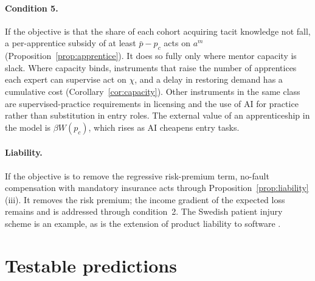 \documentclass[12pt]{article}
\theoremstyle{remark}
\begin{document}
\paragraph{Condition 5.} If the objective is that the share of each cohort acquiring tacit knowledge not fall, a per-apprentice subsidy of at least $\bar p-p_c$ acts on $a^m$ (Proposition~\ref{prop:apprentice}). It does so fully only where mentor capacity is slack. Where capacity binds, instruments that raise the number of apprentices each expert can supervise act on $\chi$, and a delay in restoring demand has a cumulative cost (Corollary~\ref{cor:capacity}). Other instruments in the same class are supervised-practice requirements in licensing and the use of AI for practice rather than substitution in entry roles. The external value of an apprenticeship in the model is $\beta W(p_c)$, which rises as AI cheapens entry tasks.

\paragraph{Liability.} If the objective is to remove the regressive risk-premium term, no-fault compensation with mandatory insurance acts through Proposition~\ref{prop:liability}(iii). It removes the risk premium; the income gradient of the expected loss remains and is addressed through condition~2. The Swedish patient injury scheme \citep{sweden1996patient} is an example, as is the extension of product liability to software \citep{eu2024pld}.

\section{Testable predictions}\label{sec:predictions}
\end{document}
